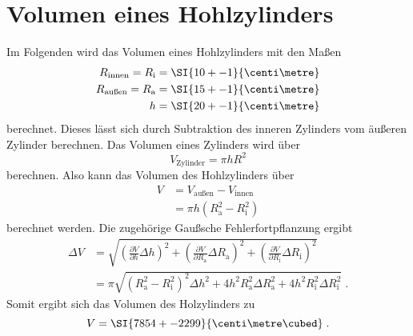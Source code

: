 \section{Volumen eines Hohlzylinders}
\label{sec:Hohlzylinder}

Im Folgenden wird das Volumen eines Hohlzylinders mit den Maßen
\begin{align*}
    R_\text{innen} = R_\text{i} &= \SI{10+-1}{\centi\metre} \\
    R_\text{außen} = R_\text{a} &= \SI{15+-1}{\centi\metre} \\
    h &= \SI{20+-1}{\centi\metre}
\end{align*}
berechnet. Dieses lässt sich durch Subtraktion des inneren Zylinders vom äußeren Zylinder berechnen.
Das Volumen eines Zylinders wird über
\begin{equation}
    V_\text{Zylinder} = \pi h R^2
\end{equation}
berechnen.
Also kann das Volumen des Hohlzylinders über
\begin{align*}
    V &= V_\text{außen} - V_\text{innen} \\
    &= \pi h (R_\text{a}^2 - R_\text{i}^2) 
\end{align*}
berechnet werden.
Die zugehörige Gaußsche Fehlerfortpflanzung ergibt
\begin{align*}
    \Delta V &= \sqrt{\left(\frac{\partial V}{\partial h} \Delta h \right)^2 + \left(\frac{\partial V}{\partial R_\text{a}} \Delta R_\text{a} \right)^2 + \left(\frac{\partial V}{\partial R_\text{i}} \Delta R_\text{i} \right)^2} \\
    &= \pi \sqrt{ (R_\text{a}^2 - R_\text{i}^2)^2 \Delta h^2 + 4 h^2 R_\text{a}^2 \Delta R_\text{a}^2 + 4 h^2 R_\text{i}^2 \Delta R_\text{i}^2 } \; .
\end{align*}
Somit ergibt sich das Volumen des Holzylinders zu
\begin{equation}
    V = \SI{7854+-2299}{\centi\metre\cubed} \; .
\end{equation}